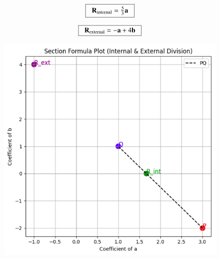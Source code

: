 \documentclass[article,12pt,onecolumn]{IEEEtran}
\theoremstyle{remark}
\begin{document}
\[
\boxed{\;\;\Large \vec{R}_{\text{internal}} = \tfrac{5}{3}\vec{a}\;\;}
\]

\[
\boxed{\;\;\Large \vec{R}_{\text{external}} = -\vec{a} + 4\vec{b}\;\;}
\]

\begin{figure}[H]
    \centering
    \includegraphics[width=\columnwidth]{figs/mg1plot.png}
\end{figure}
\end{document}
